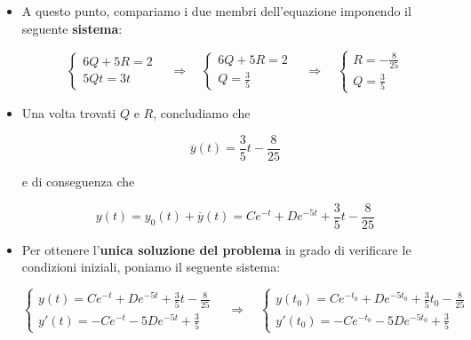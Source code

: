 \documentclass[a4paper, 12pt]{report}
\begin{document}
\begin{itemize}
\begin{itemize}
            \item A questo punto, compariamo i due membri dell'equazione imponendo il seguente \textbf{sistema}:
            
            $$ 
            \left \{ \begin{array}{l}
                6Q+5R = 2 \\
                5Qt = 3t
            \end{array}\right .
            \quad \Longrightarrow \quad
            \left \{ \begin{array}{l}
                6Q+5R = 2 \\
                Q = \frac{3}{5}
            \end{array}\right .
            \quad \Longrightarrow \quad
            \left \{ \begin{array}{l}
                R = -\frac{8}{25} \\
                Q = \frac{3}{5}
            \end{array}\right .
            $$
            
            \item Una volta trovati $Q$ e $R$, concludiamo che
            
            \[ \overline{y}(t) = \frac{3}{5}t - \frac{8}{25}\]
            
            e di conseguenza che
            
            \[ y(t) = y_0(t) + \overline{y}(t) = Ce^{-t}+De^{-5t} + \frac{3}{5}t - \frac{8}{25}\]
            
            \item Per ottenere l'\textbf{unica soluzione del problema} in grado di verificare le condizioni iniziali, poniamo il seguente sistema:
            
            $$ 
            \left \{ \begin{array}{l}
                y(t) = Ce^{-t}+De^{-5t} + \frac{3}{5}t - \frac{8}{25} \\
                y'(t) = -Ce^{-t}-5De^{-5t}+\frac{3}{5}
            \end{array}\right .
            \quad \Longrightarrow \quad 
            \left \{ \begin{array}{l}
                y(t_0) = Ce^{-t_0}+De^{-5t_0} + \frac{3}{5}t_0 - \frac{8}{25} \\
                y'(t_0) = -Ce^{-t_0}-5De^{-5t_0}+\frac{3}{5}
            \end{array}\right .
            $$
            

\end{itemize}
\end{itemize}
\end{document}
